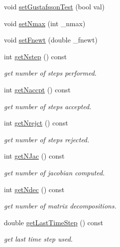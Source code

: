 \begin{DoxyCompactItemize}
\item 
void \hyperlink{classodes_1_1Radau5cc_a0bb7e7fe363b343a024500e031e6b7e9}{set\+Gustafsson\+Test} (bool val)
\item 
void \hyperlink{classodes_1_1Radau5cc_a94a01a41bda7f6e63e756fd8ba9f50f7}{set\+Nmax} (int \+\_\+nmax)
\item 
void \hyperlink{classodes_1_1Radau5cc_a19f8c9954b7d6cfa2dfbb9718c3cd506}{set\+Fnewt} (double \+\_\+fnewt)
\item 
int \hyperlink{classodes_1_1Radau5cc_a02c7ae60849eec0ab3229c702d027441}{get\+Nstep} () const 
\begin{DoxyCompactList}\small\item\em get number of steps performed. \end{DoxyCompactList}\item 
int \hyperlink{classodes_1_1Radau5cc_af6a62564a5e98a69a906c75c077f918d}{get\+Naccpt} () const 
\begin{DoxyCompactList}\small\item\em get number of steps accepted. \end{DoxyCompactList}\item 
int \hyperlink{classodes_1_1Radau5cc_a6f7c73b74c3de68b1e8ed9cc948f5da4}{get\+Nrejct} () const 
\begin{DoxyCompactList}\small\item\em get number of steps rejected. \end{DoxyCompactList}\item 
int \hyperlink{classodes_1_1Radau5cc_ad369e8cda90230d3632c61aea00eef74}{get\+N\+Jac} () const 
\begin{DoxyCompactList}\small\item\em get number of jacobian computed. \end{DoxyCompactList}\item 
int \hyperlink{classodes_1_1Radau5cc_a86803d5cfa5219a6fbbb63bd9576ecf1}{get\+Ndec} () const 
\begin{DoxyCompactList}\small\item\em get number of matrix decompositions. \end{DoxyCompactList}\item 
double \hyperlink{classodes_1_1Radau5cc_a84f2521afde22fe621a92526e5f402b8}{get\+Last\+Time\+Step} () const 
\begin{DoxyCompactList}\small\item\em get last time step used. \end{DoxyCompactList}\item 

\end{DoxyCompactItemize}
